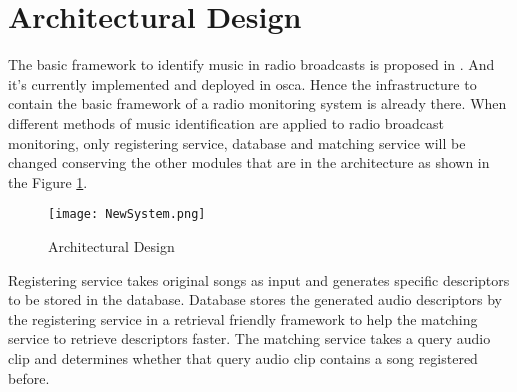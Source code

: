 \section{Architectural Design}

The basic framework to identify music in radio broadcasts is proposed in 
\cite{Nishan}. And it's currently
implemented and deployed in \ac{osca}. Hence the infrastructure to contain the basic framework
of a radio monitoring system is already there. When different methods of music identification
are applied to radio broadcast monitoring, only registering service, database and matching service
will be changed conserving the other modules that are in the architecture as shown in the Figure
\ref{fig:new_arch}.

\begin{figure}[H]
    \centering
    \texttt{[image: NewSystem.png]}
    \caption{Architectural Design}
    \label{fig:new_arch}
\end{figure}

Registering service takes original songs as input and generates specific descriptors to be stored
in the database. Database stores the generated audio descriptors by the registering service in a
retrieval friendly framework to help the matching service to retrieve descriptors faster. The matching
service takes a query audio clip and determines whether that query audio clip contains a song registered
before.     